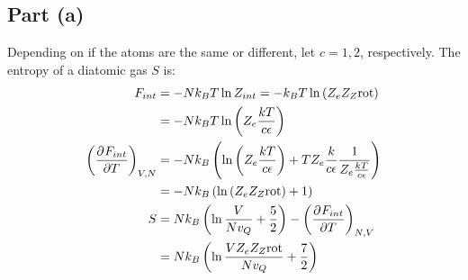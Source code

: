 \documentclass{article}
\begin{document}
\subsection*{Part (a)}
Depending on if the atoms are the same or different, let $c = 1, 2$, respectively. The entropy of a diatomic gas $S$ is:
\begin{equation}
    \begin{split}
        F_{int} & = -Nk_BT\ln Z_{int} = -k_BT\ln \left(Z_eZ_Z{\text{rot}}\right) \\
        & = -Nk_BT\ln \left(Z_e\frac{kT}{c\epsilon}\right) \\
        {\left(\frac{\partial^{}F_{int}} {\partial T^{}}\right)}_{V,N} & = -Nk_B\left(\ln\left(Z_e\frac{kT}{c\epsilon}\right) + TZ_e\frac{k}{c\epsilon}\frac{1} {Z_e\frac{kT}{c\epsilon}}\right) \\
        & = -Nk_B\left(\ln \left(Z_eZ_Z{\text{rot}}\right) + 1\right) \\
        S & = Nk_B\left(\ln\frac{V}{Nv_Q} + \frac{5}{2}\right) - {\left(\frac{\partial^{}F_{int}} {\partial T^{}}\right)}_{N,V} \\
        & = Nk_B\left(\ln\frac{VZ_eZ_Z{\text{rot}}}{Nv_Q} + \frac{7}{2}\right)
    \end{split}
\end{equation}
\end{document}
